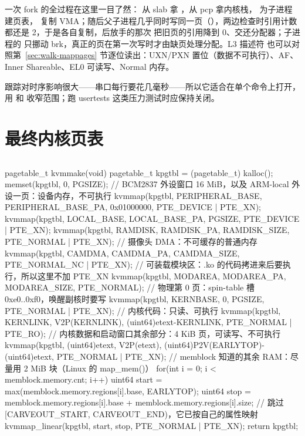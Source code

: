 一次 fork 的全过程在这里一目了然： 从 slab 拿 ，从 pcp 拿内核栈， 为子进程建页表， 复制 VMA；随后父子进程几乎同时写同一页（），两边检查时引用计数都还是 2，于是各自复制，后放手的那次  把旧页的引用降到 0、交还分配器；子进程的  只挪动 brk，真正的页在第一次写时才由缺页处理分配。L3 描述符  也可以对照第~\ref{sec:walk-mappages} 节逐位读出：UXN/PXN 置位（数据不可执行）、AF、Inner Shareable、EL0 可读写、Normal 内存。

跟踪对时序影响很大——串口每行要花几毫秒——所以它适合在单个命令上打开，用  和  收窄范围；跑 usertests 这类压力测试时应保持关闭。

\section{最终内核页表}

\subsection{}

\begin{ccode}
pagetable_t kvmmake(void) {
  pagetable_t kpgtbl = (pagetable_t) kalloc();
  memset(kpgtbl, 0, PGSIZE);
  // BCM2837 外设窗口 16 MiB，以及 ARM-local 外设一页：设备内存，不可执行
  kvmmap(kpgtbl, PERIPHERAL_BASE, PERIPHERAL_BASE_PA, 0x01000000, PTE_DEVICE | PTE_XN);
  kvmmap(kpgtbl, LOCAL_BASE, LOCAL_BASE_PA, PGSIZE, PTE_DEVICE | PTE_XN);
  kvmmap(kpgtbl, RAMDISK, RAMDISK_PA, RAMDISK_SIZE, PTE_NORMAL | PTE_XN);
  // 摄像头 DMA：不可缓存的普通内存
  kvmmap(kpgtbl, CAMDMA, CAMDMA_PA, CAMDMA_SIZE, PTE_NORMAL_NC | PTE_XN);
  // 可装载模块区：.ko 的代码拷进来后要执行，所以这里不加 PTE_XN
  kvmmap(kpgtbl, MODAREA, MODAREA_PA, MODAREA_SIZE, PTE_NORMAL);
  // 物理第 0 页：spin-table 槽 0xe0..0xf0，唤醒副核时要写
  kvmmap(kpgtbl, KERNBASE, 0, PGSIZE, PTE_NORMAL | PTE_XN);
  // 内核代码：只读、可执行
  kvmmap(kpgtbl, KERNLINK, V2P(KERNLINK), (uint64)etext-KERNLINK, PTE_NORMAL | PTE_RO);
  // 内核数据和启动窗口其余部分：4 KiB 页，可读写、不可执行
  kvmmap(kpgtbl, (uint64)etext, V2P(etext), (uint64)P2V(EARLYTOP)-(uint64)etext,
         PTE_NORMAL | PTE_XN);
  // memblock 知道的其余 RAM：尽量用 2 MiB 块（Linux 的 map_mem()）
  for(int i = 0; i < memblock.memory.cnt; i++){
    uint64 start = max(memblock.memory.regions[i].base, EARLYTOP);
    uint64 stop  = memblock.memory.regions[i].base + memblock.memory.regions[i].size;
    // 跳过 [CARVEOUT_START, CARVEOUT_END)，它已按自己的属性映射
    kvmmap_linear(kpgtbl, start, stop, PTE_NORMAL | PTE_XN);
  }
  return kpgtbl;
}
\end{ccode}

